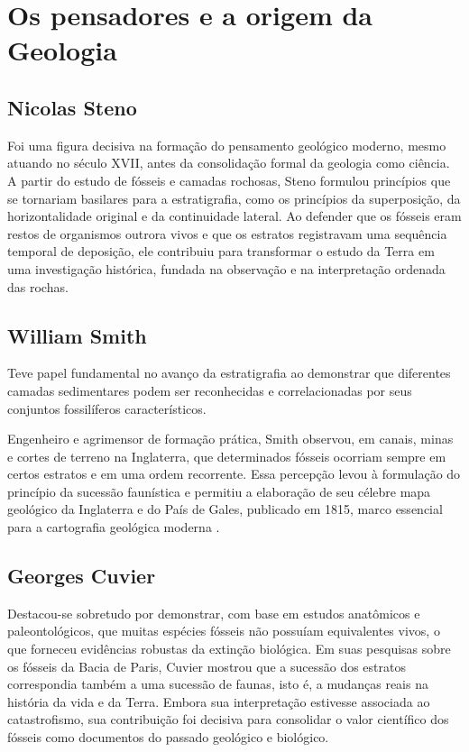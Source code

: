 \section{Os pensadores e a origem da Geologia}
\subsection{Nicolas Steno} Foi uma figura decisiva na formação do pensamento geológico moderno, mesmo atuando no século XVII, antes da consolidação formal da geologia como ciência. A partir do estudo de fósseis e camadas rochosas, Steno formulou princípios que se tornariam basilares para a estratigrafia, como os princípios da superposição, da horizontalidade original e da continuidade lateral. Ao defender que os fósseis eram restos de organismos outrora vivos e que os estratos registravam uma sequência temporal de deposição, ele contribuiu para transformar o estudo da Terra em uma investigação histórica, fundada na observação e na interpretação ordenada das rochas.

\subsection{William Smith}
Teve papel fundamental no avanço da estratigrafia ao demonstrar que diferentes camadas sedimentares podem ser reconhecidas e correlacionadas por seus conjuntos fossilíferos característicos. 

Engenheiro e agrimensor de formação prática, Smith observou, em canais, minas e cortes de terreno na Inglaterra, que determinados fósseis ocorriam sempre em certos estratos e em uma ordem recorrente. Essa percepção levou à formulação do princípio da sucessão faunística e permitiu a elaboração de seu célebre mapa geológico da Inglaterra e do País de Gales, publicado em 1815, marco essencial para a cartografia geológica moderna \parencite{geolsoc_smith}.

\subsection{Georges Cuvier} 
Destacou-se sobretudo por demonstrar, com base em estudos anatômicos e paleontológicos, que muitas espécies fósseis não possuíam equivalentes vivos, o que forneceu evidências robustas da extinção biológica. Em suas pesquisas sobre os fósseis da Bacia de Paris, Cuvier mostrou que a sucessão dos estratos correspondia também a uma sucessão de faunas, isto é, a mudanças reais na história da vida e da Terra. Embora sua interpretação estivesse associada ao catastrofismo, sua contribuição foi decisiva para consolidar o valor científico dos fósseis como documentos do passado geológico e biológico.

